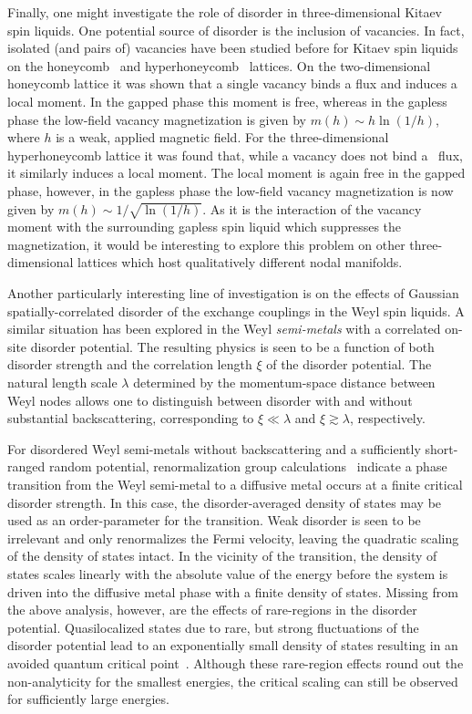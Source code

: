 Finally, one might investigate the role of disorder in three-dimensional Kitaev spin liquids.
One potential source of disorder is the inclusion of vacancies.
In fact, isolated (and pairs of) vacancies have been studied before for Kitaev spin liquids on the honeycomb~\cite{WillansPRL2010,WillansPRB2011,SanthoshPRB2012,HalaszPRB2014} and hyperhoneycomb~\cite{SreejithPRB2016} lattices.
On the two-dimensional honeycomb lattice it was shown that a single vacancy binds a flux and induces a local moment.
In the gapped phase this moment is free, whereas in the gapless phase the low-field vacancy magnetization is given by $m(h) \sim h \ln{(1/h)}$, where $h$ is a weak, applied magnetic field.
For the three-dimensional hyperhoneycomb lattice it was found that, while a vacancy does not bind a \ZZ~flux, it similarly induces a local moment.
The local moment is again free in the gapped phase, however, in the gapless phase the low-field vacancy magnetization is now given by $m(h) \sim 1/\sqrt{\ln{(1/h)}}$.
As it is the interaction of the vacancy moment with the surrounding gapless spin liquid which suppresses the magnetization, it would be interesting to explore this problem on other three-dimensional lattices which host qualitatively different nodal manifolds.

Another particularly interesting line of investigation is on the effects of Gaussian spatially-correlated disorder of the exchange couplings in the Weyl spin liquids.
A similar situation has been explored in the Weyl \textit{semi-metals} with a correlated on-site disorder potential.
The resulting physics is seen to be a function of both disorder strength and the correlation length $\xi$ of the disorder potential.
The natural length scale $\lambda$ determined by the momentum-space distance between Weyl nodes allows one to distinguish between disorder with and without substantial backscattering, corresponding to $\xi \ll \lambda$ and $\xi \gtrsim \lambda$, respectively.

For disordered Weyl semi-metals without backscattering and a sufficiently short-ranged random potential, renormalization group calculations~\cite{SyzranovPRB2015} indicate a phase transition from the Weyl semi-metal to a diffusive metal occurs at a finite critical disorder strength.
In this case, the disorder-averaged density of states may be used as an order-parameter for the transition.
Weak disorder is seen to be irrelevant and only renormalizes the Fermi velocity, leaving the quadratic scaling of the density of states intact.
In the vicinity of the transition, the density of states scales linearly with the absolute value of the energy before the system is driven into the diffusive metal phase with a finite density of states.
Missing from the above analysis, however, are the effects of rare-regions in the disorder potential.
Quasilocalized states due to rare, but strong fluctuations of the disorder potential lead to an exponentially small density of states resulting in an avoided quantum critical point~\cite{NandkishorePRB2014,PixleyPRX2016}.
Although these rare-region effects round out the non-analyticity for the smallest energies, the critical scaling can still be observed for sufficiently large energies.

